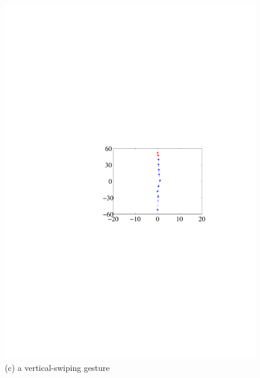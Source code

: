 \begin{figure}[!t]
{\begin{minipage}[t]{0.19\textwidth}
            \includegraphics[width=\textwidth]{fig/gesture-distinction3.pdf}\\
            \centering  (c) a vertical-swiping gesture
            \end{minipage}
        }
        \hspace{0.25cm}
\end{figure}
